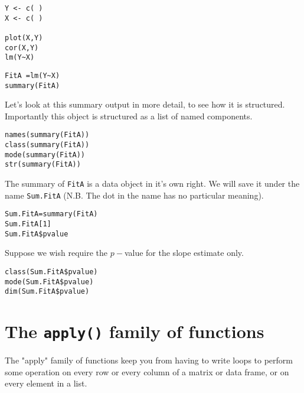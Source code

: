 \documentclass[a4paper,12pt]{article}
\begin{document}
\begin{framed}
\begin{verbatim}
Y <- c( )
X <- c( )

plot(X,Y)
cor(X,Y)
lm(Y~X)
\end{verbatim}
\end{framed}
\begin{framed}
\begin{verbatim}
FitA =lm(Y~X)
summary(FitA)
\end{verbatim}
\end{framed}
Let's look at this summary output in more detail, to see how it is structured. Importantly this object is structured as a list of named components.
\begin{framed}
\begin{verbatim}
names(summary(FitA))
class(summary(FitA))
mode(summary(FitA))
str(summary(FitA))
\end{verbatim}
\end{framed}

The summary of \texttt{FitA} is a data object in it's own right. We will save it under the name \texttt{Sum.FitA} (N.B. The dot in the name has no particular meaning).
\begin{framed}
\begin{verbatim}
Sum.FitA=summary(FitA)
Sum.FitA[1]
Sum.FitA$pvalue
\end{verbatim}
\end{framed}
Suppose we wish require the $p-$value for the slope estimate only.
\begin{framed}
\begin{verbatim}
class(Sum.FitA$pvalue)
mode(Sum.FitA$pvalue)
dim(Sum.FitA$pvalue)
\end{verbatim}
\end{framed}
\section{The \texttt{apply()} family of functions}

The "apply" family of functions keep you from having to write loops to perform 
some operation on every row or every column of a matrix or data frame, or on 
every element in a list.
\end{document}
